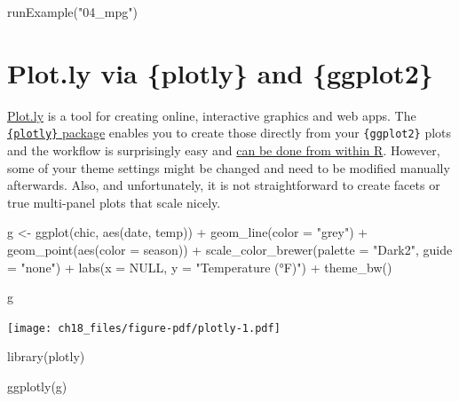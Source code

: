 \documentclass[
  letterpaper,
  DIV=11,
  numbers=noendperiod]{scrreprt}
\newenvironment{Shaded}{\begin{snugshade}}{\end{snugshade}}
\newcommand{\AttributeTok}[1]{\textcolor[rgb]{0.40,0.45,0.13}{#1}}
\newcommand{\ConstantTok}[1]{\textcolor[rgb]{0.56,0.35,0.01}{#1}}
\newcommand{\FunctionTok}[1]{\textcolor[rgb]{0.28,0.35,0.67}{#1}}
\newcommand{\NormalTok}[1]{\textcolor[rgb]{0.00,0.23,0.31}{#1}}
\newcommand{\OtherTok}[1]{\textcolor[rgb]{0.00,0.23,0.31}{#1}}
\newcommand{\SpecialCharTok}[1]{\textcolor[rgb]{0.37,0.37,0.37}{#1}}
\newcommand{\StringTok}[1]{\textcolor[rgb]{0.13,0.47,0.30}{#1}}
\begin{document}
\begin{Shaded}
\begin{Highlighting}[]
\FunctionTok{runExample}\NormalTok{(}\StringTok{"04\_mpg"}\NormalTok{)}
\end{Highlighting}
\end{Shaded}

\section{Plot.ly via \{plotly\} and
\{ggplot2\}}\label{plot.ly-via-plotly-and-ggplot2}

\href{https://chart-studio.plotly.com/feed/\#/}{Plot.ly} is a tool for
creating online, interactive graphics and web apps. The
\href{https://plot.ly/r/getting-started/}{\texttt{\{plotly\}} package}
enables you to create those directly from your \texttt{\{ggplot2\}}
plots and the workflow is surprisingly easy and
\href{https://plotly-r.com/}{can be done from within R}. However, some
of your theme settings might be changed and need to be modified manually
afterwards. Also, and unfortunately, it is not straightforward to create
facets or true multi-panel plots that scale nicely.

\begin{Shaded}
\begin{Highlighting}[]
\NormalTok{g }\OtherTok{\textless{}{-}} \FunctionTok{ggplot}\NormalTok{(chic, }\FunctionTok{aes}\NormalTok{(date, temp)) }\SpecialCharTok{+}
  \FunctionTok{geom\_line}\NormalTok{(}\AttributeTok{color =} \StringTok{"grey"}\NormalTok{) }\SpecialCharTok{+}
  \FunctionTok{geom\_point}\NormalTok{(}\FunctionTok{aes}\NormalTok{(}\AttributeTok{color =}\NormalTok{ season)) }\SpecialCharTok{+}
  \FunctionTok{scale\_color\_brewer}\NormalTok{(}\AttributeTok{palette =} \StringTok{"Dark2"}\NormalTok{, }\AttributeTok{guide =} \StringTok{"none"}\NormalTok{) }\SpecialCharTok{+}
  \FunctionTok{labs}\NormalTok{(}\AttributeTok{x =} \ConstantTok{NULL}\NormalTok{, }\AttributeTok{y =} \StringTok{"Temperature (°F)"}\NormalTok{) }\SpecialCharTok{+}
  \FunctionTok{theme\_bw}\NormalTok{()}

\NormalTok{g}
\end{Highlighting}
\end{Shaded}

\texttt{[image: ch18\_files/figure-pdf/plotly-1.pdf]}

\begin{Shaded}
\begin{Highlighting}[]
\FunctionTok{library}\NormalTok{(plotly)}

\FunctionTok{ggplotly}\NormalTok{(g)}
\end{Highlighting}
\end{Shaded}
\end{document}
